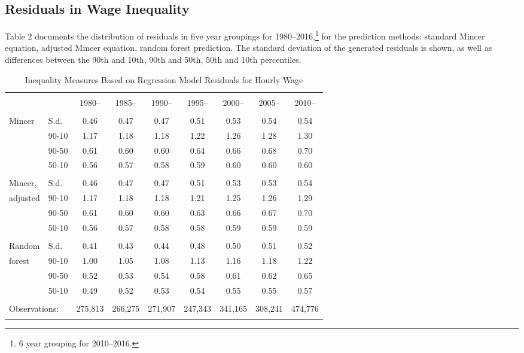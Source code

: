 \documentclass[notitlepage,12pt]{article}
\begin{document}
\subsection{Residuals in Wage Inequality}
Table 2 documents the distribution of residuals in five year groupings for 1980--2016,\footnote{6 year grouping for 2010--2016.} for the prediction methods: standard Mincer equation, adjusted Mincer equation, random forest prediction.  The standard deviation of the generated residuals is shown, as well as differences between the 90th and 10th, 90th and 50th, 50th and 10th percentiles.
\begin{table}[h]
\centering
\caption{Inequality Measures Based on Regression Model Residuals for Hourly Wage}
\begin{tabular}{@{\extracolsep{5pt}}ll|ccccccc} 
\\[-1.8ex]\hline 
\hline \\[-1.8ex] 
 & & 1980-- & 1985-- & 1990-- & 1995-- & 2000-- & 2005-- & 2010-- \\
\hline \\[-1.8ex] 
  Mincer & S.d. & 0.46 & 0.47 & 0.47 & 0.51 & 0.53 & 0.54 & 0.54 \\ 
   & 90-10 & 1.17 & 1.18 & 1.18 & 1.22 & 1.26 & 1.28 & 1.30 \\ 
   & 90-50 & 0.61 & 0.60 & 0.60 & 0.64 & 0.66 & 0.68 & 0.70 \\ 
   & 50-10 & 0.56 & 0.57 & 0.58 & 0.59 & 0.60 & 0.60 & 0.60 \\ \hline \\[-1.8ex] 
  Mincer, & S.d. & 0.46 & 0.47 & 0.47 & 0.51 & 0.53 & 0.53 & 0.54 \\
  adjusted & 90-10 & 1.17 & 1.18 & 1.18 & 1.21 & 1.25 & 1.26 & 1.29 \\ 
   & 90-50 & 0.61 & 0.60 & 0.60 & 0.63 & 0.66 & 0.67 & 0.70 \\ 
   & 50-10 & 0.56 & 0.57 & 0.58 & 0.58 & 0.59 & 0.59 & 0.59 \\ \hline \\[-1.8ex] 
  Random & S.d. & 0.41 & 0.43 & 0.44 & 0.48 & 0.50 & 0.51 & 0.52 \\ 
  forest & 90-10 & 1.00 & 1.05 & 1.08 & 1.13 & 1.16 & 1.18 & 1.22 \\ 
   & 90-50 & 0.52 & 0.53 & 0.54 & 0.58 & 0.61 & 0.62 & 0.65 \\ 
   & 50-10 & 0.49 & 0.52 & 0.53 & 0.54 & 0.55 & 0.55 & 0.57 \\ \hline \\[-1.8ex] 
  \multicolumn{2}{l}{Observations:}  & 275,813 & 266,275 & 271,907 & 247,343 & 341,165 & 308,241 & 474,776 \\ 
\hline 
\hline \\[-1.8ex] 
\end{tabular} 
\end{table}
\end{document}
